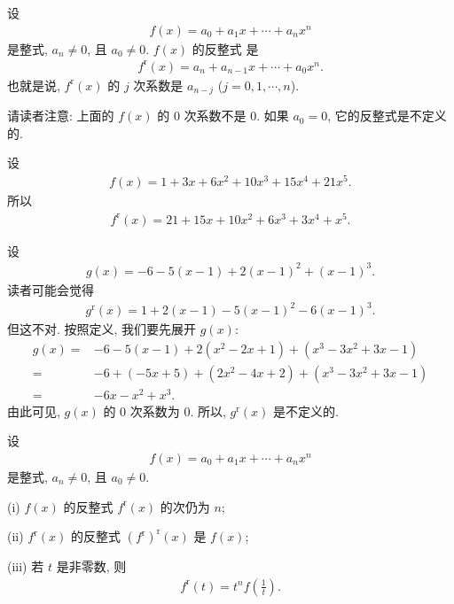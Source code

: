 \begin{definition}
    设
    \begin{align*}
        f(x) = a_0 + a_1 x + \cdots + a_n x^n
    \end{align*}
    是整式, $a_n \neq 0$, 且 $a_0 \neq 0$. $f(x)$ 的反整式  是
    \begin{align*}
        f^{\mathrm{r}} (x) = a_n + a_{n-1} x + \cdots + a_0 x^n.
    \end{align*}
    也就是说, $f^{\mathrm{r}} (x)$ 的 $j$ 次系数是 $a_{n-j}$ ($j = 0,1,\cdots,n$).

    请读者注意: 上面的 $f(x)$ 的 $0$ 次系数不是 $0$. 如果 $a_0 = 0$, 它的反整式是不定义的.
\end{definition}

\begin{example}
    设
    \begin{align*}
        f(x) = 1 + 3x + 6x^2 + 10x^3 + 15x^4 + 21x^5.
    \end{align*}
    所以
    \begin{align*}
        f^{\mathrm{r}} (x) = 21 + 15x + 10x^2 + 6x^3 + 3x^4 + x^5.
    \end{align*}
\end{example}

\begin{example}
    设
    \begin{align*}
        g(x) = -6 - 5 (x - 1) + 2 (x - 1)^2 + (x - 1)^3.
    \end{align*}
    读者可能会觉得
    \begin{align*}
        g^{\mathrm{r}} (x) = 1 + 2 (x - 1) - 5 (x - 1)^2 - 6 (x - 1)^3.
    \end{align*}
    但这不对. 按照定义, 我们要先展开 $g(x)$:
    \begin{align*}
        g(x)
        = {} & -6 - 5(x - 1) + 2 (x^2 - 2x + 1) + (x^3 - 3x^2 + 3x - 1) \\
        = {} & -6 + (-5x + 5) + (2x^2 - 4x + 2) + (x^3 - 3x^2 + 3x - 1) \\
        = {} & -6x - x^2 + x^3.
    \end{align*}
    由此可见, $g(x)$ 的 $0$ 次系数为 $0$. 所以, $g^{\mathrm{r}} (x)$ 是不定义的.
\end{example}

\begin{proposition}
    设
    \begin{align*}
        f(x) = a_0 + a_1 x + \cdots + a_n x^n
    \end{align*}
    是整式, $a_n \neq 0$, 且 $a_0 \neq 0$.

    (i) $f(x)$ 的反整式 $f^{\mathrm{r}} (x)$ 的次仍为 $n$;

    (ii) $f^{\mathrm{r}}(x)$ 的反整式 $(f^{\mathrm{r}})^{\mathrm{r}} (x)$ 是 $f(x)$;

    (iii) 若 $t$ 是非零数, 则
    \begin{align*}
        f^{\mathrm{r}} (t) = t^n f \left( \frac{1}{t} \right).
    \end{align*}
\end{proposition}

